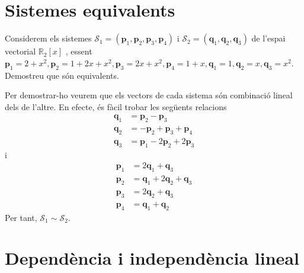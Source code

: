 \section{Sistemes equivalents}

\begin{exercici}
Considerem els sistemes $\mathcal{S}_{1}=(\mathbf{p}_{1},\mathbf{p}_{2},%
\mathbf{p}_{3},\mathbf{p}_{4})$ i $\mathcal{S}_{2}=(\mathbf{q}_{1},\mathbf{q}%
_{2},\mathbf{q}_{3})$ de l’espai vectorial $\mathbb{R}_{2}\left[ x\right] $%
, essent $\mathbf{p}_{1}=2+x^{2},\mathbf{p}_{2}=1+2x+x^{2},\mathbf{p}%
_{3}=2x+x^{2},\mathbf{p}_{4}=1+x,\mathbf{q}_{1}=1,\mathbf{q}_{2}=x,\mathbf{q}%
_{3}=x^{2}$. Demostreu que són equivalents.

\end{exercici}
\begin{solucio}
Per demostrar-ho veurem que els vectors de cada sistema són combinació lineal dels de l'altre. En efecte, és fàcil trobar les següents
relacions%
\begin{align*}
\mathbf{q}_{1} &=\mathbf{p}_{2}-\mathbf{p}_{3} \\
\mathbf{q}_{2} &=-\mathbf{p}_{2}+\mathbf{p}_{3}+\mathbf{p}_{4} \\
\mathbf{q}_{3} &=\mathbf{p}_{1}-2\mathbf{p}_{2}+2\mathbf{p}_{3}
\end{align*}%
i%
\begin{align*}
\mathbf{p}_{1} &=2\mathbf{q}_{1}+\mathbf{q}_{3} \\
\mathbf{p}_{2} &=\mathbf{q}_{1}+2\mathbf{q}_{2}+\mathbf{q}_{3} \\
\mathbf{p}_{3} &=2\mathbf{q}_{2}+\mathbf{q}_{3} \\
\mathbf{p}_{4} &=\mathbf{q}_{1}+\mathbf{q}_{2}
\end{align*}%
Per tant, $\mathcal{S}_{1}\sim \mathcal{S}_{2}$.
\end{solucio}

\section{Dependència i independència lineal}

